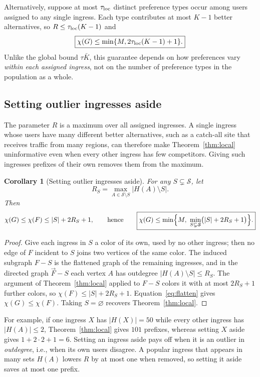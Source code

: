 \documentclass[10pt,a4paper]{article}
\newtheorem{corollary}[theorem]{Corollary}
\newcommand{\Sset}{\mathcal S}
\begin{document}
Alternatively, suppose at most $\tau_{\rm loc}$ distinct preference types occur among users assigned to any single ingress. Each type contributes at most $K-1$ better alternatives, so $R\le \tau_{\rm loc}(K-1)$ and
\begin{equation}\label{eq:types}
\boxed{\chi(G)\le\min\{M,2\tau_{\rm loc}(K-1)+1\}.}
\end{equation}
Unlike the global bound $\tau \bar K$, this guarantee depends on how preferences vary \emph{within each assigned ingress}, not on the number of preference types in the population as a whole.

\subsection{Setting outlier ingresses aside}

The parameter $R$ is a maximum over all assigned ingresses. A single ingress whose users have many different better alternatives, such as a catch-all site that receives traffic from many regions, can therefore make Theorem~\ref{thm:local} uninformative even when every other ingress has few competitors. Giving such ingresses prefixes of their own removes them from the maximum.

\begin{corollary}[Setting outlier ingresses aside]\label{cor:outliers}
For any $S\subsetneq\Sset$, let
\[
R_S=\max_{A\in\Sset\setminus S}|H(A)\setminus S|.
\]
Then
\[
\chi(G)\le\chi(F)\le|S|+2R_S+1,
\qquad\text{hence}\qquad
\boxed{\chi(G)\le\min\Bigl\{M,\ \min_{S\subsetneq\Sset}\bigl(|S|+2R_S+1\bigr)\Bigr\}.}
\]
\end{corollary}
\begin{proof}
Give each ingress in $S$ a color of its own, used by no other ingress; then no edge of $F$ incident to $S$ joins two vertices of the same color. The induced subgraph $F-S$ is the flattened graph of the remaining ingresses, and in the directed graph $\vec F-S$ each vertex $A$ has outdegree $|H(A)\setminus S|\le R_S$. The argument of Theorem~\ref{thm:local} applied to $F-S$ colors it with at most $2R_S+1$ further colors, so $\chi(F)\le|S|+2R_S+1$. Equation~\eqref{eq:flatten} gives $\chi(G)\le\chi(F)$. Taking $S=\varnothing$ recovers Theorem~\ref{thm:local}.
\end{proof}

For example, if one ingress $X$ has $|H(X)|=50$ while every other ingress has $|H(A)|\le 2$, Theorem~\ref{thm:local} gives $101$ prefixes, whereas setting $X$ aside gives $1+2\cdot2+1=6$. Setting an ingress aside pays off when it is an outlier in \emph{outdegree}, i.e., when its own users disagree. A popular ingress that appears in many sets $H(A)$ lowers $R$ by at most one when removed, so setting it aside saves at most one prefix.
\end{document}
